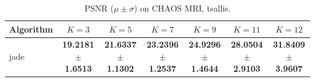 \begin{table}[htbp]
\centering
\caption{PSNR ($\mu \pm \sigma$) on CHAOS MRI, tsallis.}
\label{tab:exp2-tsallis-psnr}
\begin{tabular}{lcccccc}
\toprule
Algorithm & $K=3$ & $K=5$ & $K=7$ & $K=9$ & $K=11$ & $K=12$ \\
\midrule
jade & \textbf{19.2181 $\pm$ 1.6513} & \textbf{21.6337 $\pm$ 1.1302} & \textbf{23.2396 $\pm$ 1.2537} & \textbf{24.9296 $\pm$ 1.4644} & \textbf{28.0504 $\pm$ 2.9103} & \textbf{31.8409 $\pm$ 3.9607} \\
\bottomrule
\end{tabular}
\end{table}
